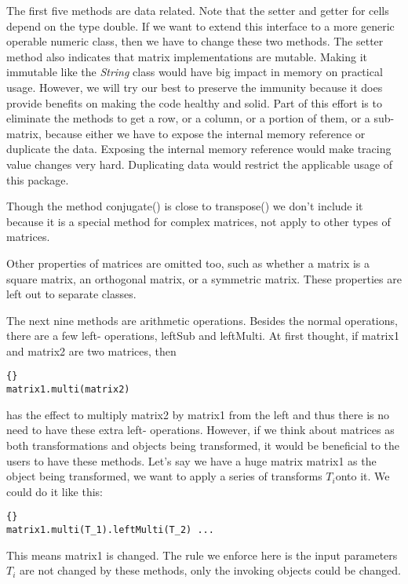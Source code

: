The first five methods are data related. Note that the setter and getter for cells depend on the type double. If we want to extend this interface to a more generic operable numeric class, then we have to change these two methods. The setter method also indicates that matrix implementations are mutable. Making it immutable like the \textit{String} class would have big impact in memory on practical usage. However, we will try our best to preserve the immunity because it does provide benefits on making the code healthy and solid. Part of this effort is to eliminate the methods to get a row, or a column, or a portion of them, or a sub-matrix, because either we have to expose the internal memory reference or duplicate the data. Exposing the internal memory reference would make tracing value changes very hard. Duplicating data would restrict the applicable usage of this package. 

Though the method conjugate() is close to transpose() we don't include it because it is a special method for complex matrices, not apply to other types of matrices.

Other properties of matrices are omitted too, such as whether a matrix is a square matrix, an orthogonal matrix, or a symmetric matrix. These properties are left out to separate classes.

The next nine methods are arithmetic operations. Besides the normal operations, there are a few left- operations, leftSub and leftMulti. At first thought, if matrix1 and matrix2 are two matrices, then 
\lstset{language=Java}
\lstset{commentstyle=\textit}
\begin{lstlisting}[frame=trbl]{}
matrix1.multi(matrix2)
\end{lstlisting}
has the effect to multiply matrix2 by matrix1 from the left and thus there is no need to have these extra left- operations. However, if we think about matrices as both transformations and objects being transformed, it would be beneficial to the users to have these methods. Let's say we have a huge matrix matrix1 as the object being transformed, we want to apply a series of transforms $T_i$onto it. We could do it like this: 
\lstset{language=Java}
\lstset{commentstyle=\textit}
\begin{lstlisting}[frame=trbl]{}
matrix1.multi(T_1).leftMulti(T_2) ...
\end{lstlisting}
This means matrix1 is changed. The rule we enforce here is the input parameters $T_i$ are not changed by these methods, only the invoking objects could be changed. 

